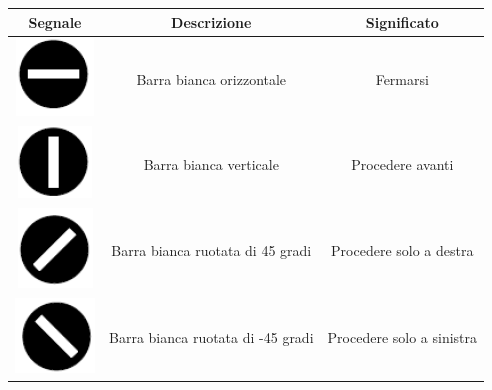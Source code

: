 \begin{tabular}{|c|c|c|}
	\hline 
	\textbf{Segnale} & \textbf{Descrizione} & \textbf{Significato} \\

	\hline
	\includegraphics{img/stopsemaphore}& Barra bianca orizzontale & Fermarsi \\ 
	\hline 
	\includegraphics{img/gosemaphore}& Barra bianca verticale  & Procedere avanti \\ 
	\hline 
	\includegraphics{img/rightsemaphore}& Barra bianca ruotata di 45 gradi & Procedere solo a destra \\ 
	\hline 
	\includegraphics{img/leftsemaphore}& Barra bianca ruotata di -45 gradi & Procedere solo a sinistra \\ 
	\hline 
\end{tabular} 